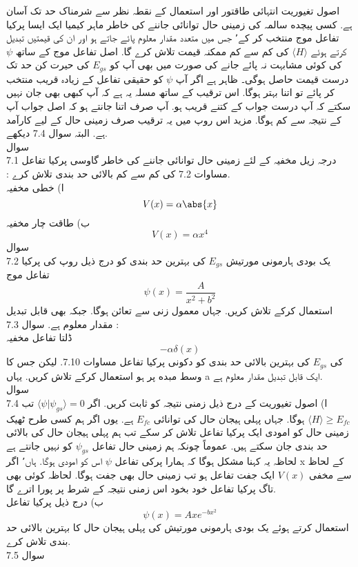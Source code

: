 اصول تغيوریت انتہائی طاقتور اور استعمال کے نقطہ نظر سے شرمناک حد تک آسان ہے. کسی پیچده سالمہ کی زمینی حال توانائی جاننے کی خاطر ماہر کیمیا ایک ایسا پرکیا تفاعل موج منتخب کر کے٬ جس میں متعدد مقدار معلوم پائے جاتے ہو اور ان کی قیمتیں تبديل کرتے ہوئے
\(  \langle H \rangle\)
کی کم سے کم ممکنہ قیمت تلاش کرے گا. اصل تفاعل موج کے ساتھ
\(\psi\) 
کی کوئی مشابہت نہ پائے جانے کی صورت میں بھی آپ کو
\( E_{gs}\)
 کی حیرت کن حد تک درست قیمت حاصل ہوگی۔ ظاہر ہے اگر آپ
\(\psi\) 
 کو حقیقی تفاعل کے زیادہ قریب منتخب کر پائے تو اتنا بہتر ہوگا. اس ترقيب کے ساتھ مسلہ یہ ہے کہ آپ کبھی بھی جان نہیں سکتے کہ آپ درست جواب کے کتنے قريب ہو. آپ صرف اتنا جانتے ہو کہ اصل جواب آپ کے نتیجہ سے كم ہوگا. مزید اس روپ میں یہ ترقيب صرف زمینی حال کے لیے کارآمد ہے.  البتہ سوال 7.4 دیکھے.\\
سوال  \\7.1
درجہ زیل مخفیہ کے لئے زمينی حال توانائی جاننے کی خاطر  گاوسی پرکیا تفاعل\\:
مساوات 7.2 کی كم سے كم بالائی حد بندی تلاش كرے.\\
ا) خطی مخفیہ
\[V(x)=\alpha\abs{x}\]
ب) طاقت چار مخفیہ
\[V(x)=\alpha x^{4}\]
سوال \\7.2
 یک بودی ہارمونی مورتیش 
 \(E_{gs}\)
  کی بہترین حد بندی کو درج ذیل روپ کی پرکیا تفاعل موج
\[\psi(x)=\frac{A}{x^{2}+b^{2}}\]
استعمال کرکے تلاش كریں. جہاں معمول زنی سے تعائن ہوگا. جبکہ بھی قابل تبديل مقدار معلوم ہے.
 سوال 7.3 : \\
 ڈلتا تفاعل مخفیہ
\[-\alpha\delta(x)\]
کی
\(E_{gs}\) 
کی بہترین بالائی حد بندی کو دکونی پرکیا تفاعل مساوات 7.10. لیکن جس کا وسط مبده پر ہو استعمال کرکے تلاش كريں. یہاں a ایک قابل تبديل مقدار معلوم ہے.\\
سوال \\7.4
ا) اصول تغيوريت کے درج ذیل زمنی نتیجہ کو ثابت کریں. اگر
\(\langle \psi | \psi_{gs} \rangle =0\)
تب
\(\langle H \rangle \ge E_{fc}\)
ہوگا. جہاں پہلی ہیجان حال کی توانائی
 \(E_{fc}\)
 ہے. یوں اگر ہم کسی طرح ٹھیک زمینی حال کو امودی ایک پرکیا تفاعل تلاش كر سکے تب ہم پہلی ہیجان حال کی بالائی حد بندی جان سکتے ہیں. عموماً چونکہ ہم زمینی حال تفاعل
 \(\psi_{gs}\)
  کو نہیں جانتے ہے لحاظہ یہ کہنا مشکل ہوگا کہ ہمارا پرکی تفاعل 
 \(\psi\)
   اس کو امودی ہوگا. ہاں٬ اگر x کے لحاظ سے مخفی
  \(V(x)\)
     ایک جفت تفاعل ہو تب زمینی حال بھی جفت ہوگا. لحاظہ کوئی بھی تاگ پرکیا تفاعل خود بخود اس زمنی نتیجہ کے شرط پر پورا اترے گا.\\
ب) درج ذیل پرکیا تفاعل
\[\psi(x)=Axe^{-bx^{2}}\]
استعمال کرتے ہوئے یک بودی ہارمونی مورتیش کی پہلی ہیجان حال کا بہترین بالائی حد بندی تلاش كرے.\\
سوال 7.5        \\
